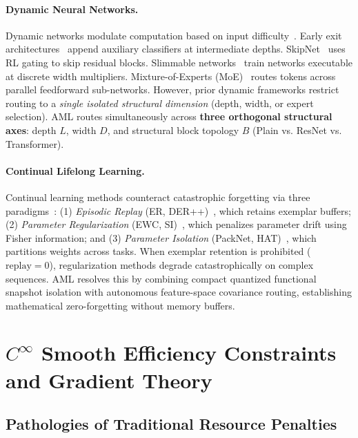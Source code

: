 \documentclass[11pt, a4paper]{article}
\begin{document}
\paragraph{Dynamic Neural Networks.}
Dynamic networks modulate computation based on input difficulty~\cite{han2021dynamic}. Early exit architectures~\cite{teerapittayanon2016branchynet, huang2018multi} append auxiliary classifiers at intermediate depths. SkipNet~\cite{wang2018skipnet} uses RL gating to skip residual blocks. Slimmable networks~\cite{yu2018slimmable} train networks executable at discrete width multipliers. Mixture-of-Experts (MoE)~\cite{shazeer2017outrageously, fedus2021switch} routes tokens across parallel feedforward sub-networks. However, prior dynamic frameworks restrict routing to a \emph{single isolated structural dimension} (depth, width, or expert selection). AML routes simultaneously across \textbf{three orthogonal structural axes}: depth $L$, width $D$, and structural block topology $B$ (Plain vs. ResNet vs. Transformer).

\paragraph{Continual Lifelong Learning.}
Continual learning methods counteract catastrophic forgetting via three paradigms~\cite{delange2021continual}: (1) \emph{Episodic Replay} (ER, DER++)~\cite{buzzega2020dark}, which retains exemplar buffers; (2) \emph{Parameter Regularization} (EWC, SI)~\cite{kirkpatrick2017overcoming, zenke2017continual}, which penalizes parameter drift using Fisher information; and (3) \emph{Parameter Isolation} (PackNet, HAT)~\cite{mallya2018packnet, serra2018overcoming}, which partitions weights across tasks. When exemplar retention is prohibited ($\text{replay}=0$), regularization methods degrade catastrophically on complex sequences. AML resolves this by combining compact quantized functional snapshot isolation with autonomous feature-space covariance routing, establishing mathematical zero-forgetting without memory buffers.

\section{$C^\infty$ Smooth Efficiency Constraints and Gradient Theory}
\label{sec:theory}

\subsection{Pathologies of Traditional Resource Penalties}
\label{sec:pathologies}
\end{document}
